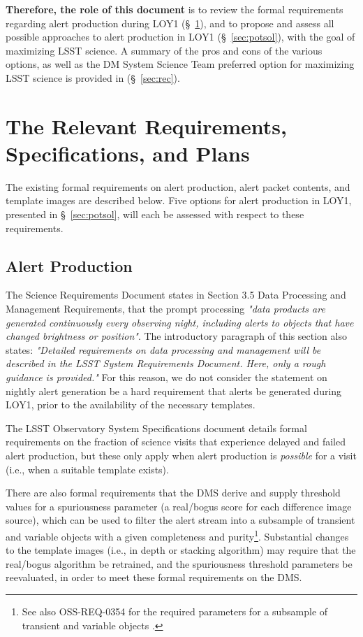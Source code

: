 \documentclass[DM,toc]{lsstdoc}
\begin{document}
{\bf Therefore, the role of this document} is to review the formal requirements regarding alert production during LOY1 (\S~\ref{sec:req}), and to propose and assess all possible approaches to alert production in LOY1 (\S~\ref{sec:potsol}), with the goal of maximizing LSST science. A summary of the pros and cons of the various options, as well as the DM System Science Team preferred option for maximizing LSST science is provided in (\S~\ref{sec:rec}).


\clearpage
\section{The Relevant Requirements, Specifications, and Plans}\label{sec:req}

The existing formal requirements on alert production, alert packet contents, and template images are described below.
Five options for alert production in LOY1, presented in \S~\ref{sec:potsol}, will each be assessed with respect to these requirements.

\subsection{Alert Production}\label{ssec:req_ap}

The Science Requirements Document  states in Section 3.5 Data Processing and Management Requirements, that the prompt processing {\it "data products are generated continuously every observing night, including alerts to objects that have changed brightness or position"}. 
The introductory paragraph of this section also states: {\it "Detailed requirements on data processing and management will be described in the LSST System Requirements Document. Here, only a rough guidance is provided."} For this reason, we do not consider the  statement on nightly alert generation be a hard requirement that alerts be generated during LOY1, prior to the availability of the necessary templates. 

The LSST Observatory System Specifications document  details formal requirements on the fraction of science visits that experience delayed and failed alert production, but these only apply when alert production is {\em possible} for a visit (i.e., when a suitable template exists).

There are also formal requirements that the DMS derive and supply threshold values for a spuriousness parameter (a real/bogus score for each difference image source), which can be used to filter the alert stream into a subsample of transient and variable objects with a given completeness and purity\footnote{See also OSS-REQ-0354 for the required parameters for a subsample of transient and variable objects .}.
Substantial changes to the template images (i.e., in depth or stacking algorithm) may require that the real/bogus algorithm be retrained, and the spuriousness threshold parameters be reevaluated, in order to meet these formal requirements on the DMS. 
\end{document}
